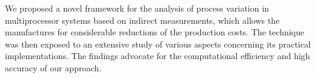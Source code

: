 We proposed a novel framework for the analysis of process variation in multiprocessor systems based on indirect measurements, which allows the manufactures for considerable reductions of the production costs. The technique was then exposed to an extensive study of various aspects concerning its practical implementations. The findings advocate for the computational efficiency and high accuracy of our approach.
